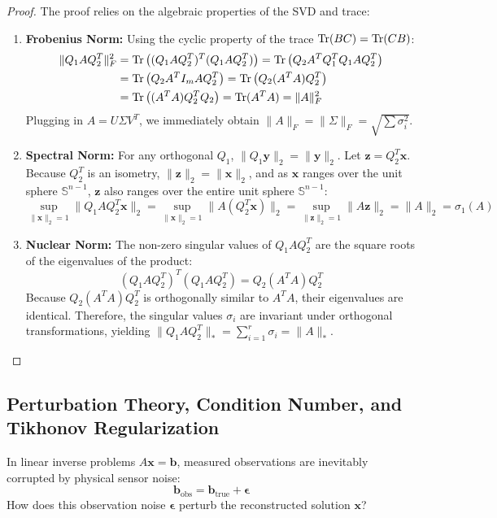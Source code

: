 \begin{proof}
The proof relies on the algebraic properties of the SVD and trace:
\begin{enumerate}
    \item \textbf{Frobenius Norm:} Using the cyclic property of the trace $\operatorname{Tr}(B C) = \operatorname{Tr}(C B)$:
    \begin{align}
    \|Q_1 A Q_2^T\|_F^2 &= \operatorname{Tr}\left( (Q_1 A Q_2^T)^T (Q_1 A Q_2^T) \right) = \operatorname{Tr}\left( Q_2 A^T Q_1^T Q_1 A Q_2^T \right) \nonumber \\
    &= \operatorname{Tr}\left( Q_2 A^T I_m A Q_2^T \right) = \operatorname{Tr}\left( Q_2 (A^T A) Q_2^T \right) \nonumber \\
    &= \operatorname{Tr}\left( (A^T A) Q_2^T Q_2 \right) = \operatorname{Tr}(A^T A) = \|A\|_F^2
    \end{align}
    Plugging in $A = U \Sigma V^T$, we immediately obtain $\|A\|_F = \|\Sigma\|_F = \sqrt{\sum \sigma_i^2}$.
    \item \textbf{Spectral Norm:} For any orthogonal $Q_1$, $\|Q_1 \mathbf{y}\|_2 = \|\mathbf{y}\|_2$. Let $\mathbf{z} = Q_2^T \mathbf{x}$. Because $Q_2^T$ is an isometry, $\|\mathbf{z}\|_2 = \|\mathbf{x}\|_2$, and as $\mathbf{x}$ ranges over the unit sphere $\mathbb{S}^{n-1}$, $\mathbf{z}$ also ranges over the entire unit sphere $\mathbb{S}^{n-1}$:
    \begin{equation}
    \sup_{\|\mathbf{x}\|_2 = 1} \|Q_1 A Q_2^T \mathbf{x}\|_2 = \sup_{\|\mathbf{x}\|_2 = 1} \|A (Q_2^T \mathbf{x})\|_2 = \sup_{\|\mathbf{z}\|_2 = 1} \|A \mathbf{z}\|_2 = \|A\|_2 = \sigma_1(A)
    \end{equation}
    \item \textbf{Nuclear Norm:} The non-zero singular values of $Q_1 A Q_2^T$ are the square roots of the eigenvalues of the product:
    \begin{equation*}
    (Q_1 A Q_2^T)^T (Q_1 A Q_2^T) = Q_2 (A^T A) Q_2^T
    \end{equation*}
    Because $Q_2 (A^T A) Q_2^T$ is orthogonally similar to $A^T A$, their eigenvalues are identical. Therefore, the singular values $\sigma_i$ are invariant under orthogonal transformations, yielding $\|Q_1 A Q_2^T\|_* = \sum_{i=1}^r \sigma_i = \|A\|_*$.
\end{enumerate}
\end{proof}

\subsection{Perturbation Theory, Condition Number, and Tikhonov Regularization}
In linear inverse problems $A\mathbf{x} = \mathbf{b}$, measured observations are inevitably corrupted by physical sensor noise:
\begin{equation}
\mathbf{b}_{\text{obs}} = \mathbf{b}_{\text{true}} + \boldsymbol{\epsilon}
\end{equation}
How does this observation noise $\boldsymbol{\epsilon}$ perturb the reconstructed solution $\mathbf{x}$?

